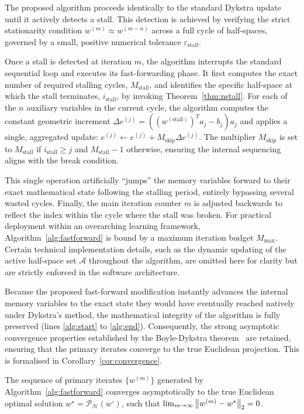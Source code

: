 The proposed algorithm proceeds identically to the standard Dykstra update until it actively detects a stall. This detection is achieved by verifying the strict stationarity condition $w^{(m)} \approx w^{(m-n)}$ across a full cycle of half-spaces, governed by a small, positive numerical tolerance $\varepsilon_{\text{stall}}$. 

Once a stall is detected at iteration $m$, the algorithm interrupts the standard sequential loop and executes its fast-forwarding phase. It first computes the exact number of required stalling cycles, $M_\text{stall}$, and identifies the specific half-space at which the stall terminates, $i_\text{stall}$, by invoking Theorem~\ref{thm:nstall}. For each of the $n$ auxiliary variables in the current cycle, the algorithm computes the constant geometric increment $\Delta e^{(j)} = ((w^{(\text{stall})})^T a_j - b_j)a_j$ and applies a single, aggregated update: $e^{(j)} \leftarrow e^{(j)} + M_{\text{skip}} \Delta e^{(j)}$. The multiplier $M_{\text{skip}}$ is set to $M_{\text{stall}}$ if $i_{\text{stall}}\geq j$ and $M_{\text{stall}}-1$ otherwise, ensuring the internal sequencing aligns with the break condition. 

This single operation artificially ``jumps'' the memory variables forward to their exact mathematical state following the stalling period, entirely bypassing several wasted cycles. Finally, the main iteration counter $m$ is adjusted backwards to reflect the index within the cycle where the stall was broken. For practical deployment within an overarching learning framework, Algorithm~\ref{alg:fastforward} is bound by a maximum iteration budget $M_{\text{max}}$. Certain technical implementation details, such as the dynamic updating of the active half-space set $\mathcal{A}$ throughout the algorithm, are omitted here for clarity but are strictly enforced in the software architecture.

Because the proposed fast-forward modification instantly advances the internal memory variables to the exact state they would have eventually reached natively under Dykstra's method, the mathematical integrity of the algorithm is fully preserved (lines \ref{alg:start} to \ref{alg:end}). Consequently, the strong asymptotic convergence properties established by the Boyle-Dykstra theorem~\cite{DYKSTRA} are retained, ensuring that the primary iterates converge to the true Euclidean projection. This is formalised in Corollary~\ref{cor:convergence}.

\begin{corollary}
\label{cor:convergence}
The sequence of primary iterates $\{w^{(m)}\}$ generated by Algorithm~\ref{alg:fastforward} converges asymptotically to the true Euclidean optimal solution $w^\star = \mathcal{P}_{\mathcal{H}}(w^\circ)$, such that $\lim_{m\rightarrow\infty}\left\| w^{(m)}-w^\star \right\|_2=0$.
\end{corollary}